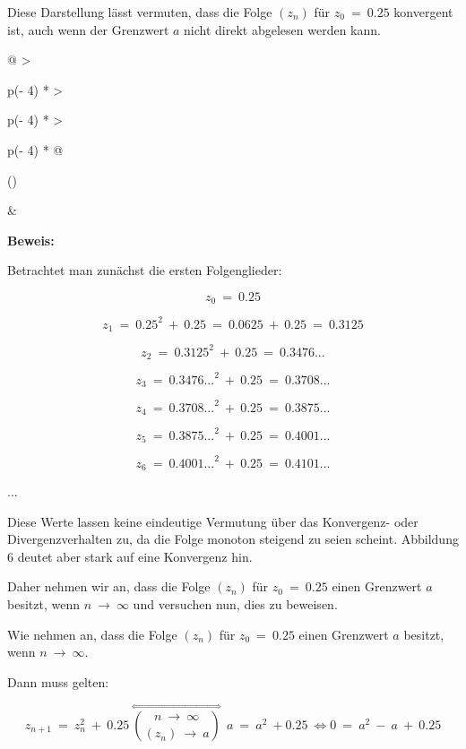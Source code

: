 \documentclass[a4paper, 12pt]{book}
\begin{document}
Diese Darstellung lässt vermuten, dass die Folge
\(\left( z_{n} \right)\) für \(z_{0}\  = \ 0.25\) konvergent ist, auch
wenn der Grenzwert \(a\) nicht direkt abgelesen werden kann.

\begin{longtable}[]{@{}
  >{\raggedright\arraybackslash}p{(\columnwidth - 4\tabcolsep) * }
  >{\raggedright\arraybackslash}p{(\columnwidth - 4\tabcolsep) * }
  >{\raggedright\arraybackslash}p{(\columnwidth - 4\tabcolsep) * }@{}}
\toprule()
\begin{minipage}[b]{\linewidth}\raggedright
\end{minipage} & \begin{minipage}[b]{\linewidth}\raggedright
\textbf{Beweis:}

Betrachtet man zunächst die ersten Folgenglieder:

\[z_{0}\  = \ 0.25\]

\[z_{1}\  = \ {0.25}^{2}\  + \ 0.25\  = \ 0.0625\  + \ 0.25\  = \ 0.3125\]

\[z_{2}\  = \ {0.3125}^{2}\  + \ 0.25\  = \ 0.3476...\]

\[z_{3}\  = \ {0.3476...}^{2}\  + \ 0.25\  = \ 0.3708...\]

\[z_{4}\  = \ {0.3708...}^{2}\  + \ 0.25\  = \ 0.3875...\]

\[z_{5}\  = \ {0.3875...}^{2}\  + \ 0.25\  = \ 0.4001...\]

\[z_{6}\  = \ {0.4001...}^{2}\  + \ 0.25\  = \ 0.4101...\]

...

Diese Werte lassen keine eindeutige Vermutung über das Konvergenz- oder
Divergenzverhalten zu, da die Folge monoton steigend zu seien scheint.
Abbildung 6 deutet aber stark auf eine Konvergenz hin.

Daher nehmen wir an, dass die Folge \(\left( z_{n} \right)\) für
\(z_{0}\  = \ 0.25\) einen Grenzwert \(a\) besitzt, wenn
\(n\  \rightarrow \ \infty\) und versuchen nun, dies zu beweisen.

Wie nehmen an, dass die Folge \(\left( z_{n} \right)\) für
\(z_{0}\  = \ 0.25\) einen Grenzwert \(a\) besitzt, wenn
\(n\  \rightarrow \ \infty\).

Dann muss gelten:

\[z_{n + 1}\  = \ z_{n}^{2}\  + \ 0.25\ \overset{\Leftrightarrow}{\binom{n\  \rightarrow \ \infty}{\left( z_{n} \right)\  \rightarrow \ a}}\ \ a\  = \ a^{2}\  + 0.25\  \Longleftrightarrow 0\  = \ a^{2}\  - \ a\  + \ 0.25\]


\end{minipage}
\end{longtable}
\end{document}
